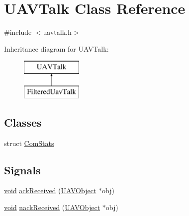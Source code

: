 \hypertarget{class_u_a_v_talk}{\section{\-U\-A\-V\-Talk \-Class \-Reference}
\label{class_u_a_v_talk}
}


{\ttfamily \#include $<$uavtalk.\-h$>$}

\-Inheritance diagram for \-U\-A\-V\-Talk\-:\begin{figure}[H]
\begin{center}
\leavevmode
\includegraphics[height=2.000000cm]{class_u_a_v_talk}
\end{center}
\end{figure}
\subsection*{\-Classes}
\begin{DoxyCompactItemize}
\item 
struct \hyperlink{struct_u_a_v_talk_1_1_com_stats}{\-Com\-Stats}
\end{DoxyCompactItemize}
\subsection*{\-Signals}
\begin{DoxyCompactItemize}
\item 
\hyperlink{group___u_a_v_objects_plugin_ga444cf2ff3f0ecbe028adce838d373f5c}{void} \hyperlink{group___u_a_v_talk_plugin_ga2d657cf81a725bce5e859eb6828cf80c}{ack\-Received} (\hyperlink{class_u_a_v_object}{\-U\-A\-V\-Object} $\ast$obj)
\item 
\hyperlink{group___u_a_v_objects_plugin_ga444cf2ff3f0ecbe028adce838d373f5c}{void} \hyperlink{group___u_a_v_talk_plugin_gac0268d5005ed3241192bae731c362f7e}{nack\-Received} (\hyperlink{class_u_a_v_object}{\-U\-A\-V\-Object} $\ast$obj)
\end{DoxyCompactItemize}
